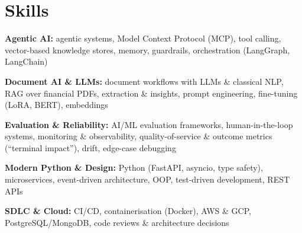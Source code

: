 \documentclass[10pt,a4paper]{article}
\begin{document}
\section{Skills}
\begin{tight}
  \item[\textcolor{accent}{\small$\bullet$}] \textbf{Agentic AI:} agentic systems, Model Context Protocol (MCP), tool calling, vector-based knowledge stores, memory, guardrails, orchestration (LangGraph, LangChain)
  \item[\textcolor{accent}{\small$\bullet$}] \textbf{Document AI \& LLMs:} document workflows with LLMs \& classical NLP, RAG over financial PDFs, extraction \& insights, prompt engineering, fine-tuning (LoRA, BERT), embeddings
  \item[\textcolor{accent}{\small$\bullet$}] \textbf{Evaluation \& Reliability:} AI/ML evaluation frameworks, human-in-the-loop systems, monitoring \& observability, quality-of-service \& outcome metrics (``terminal impact''), drift, edge-case debugging
  \item[\textcolor{accent}{\small$\bullet$}] \textbf{Modern Python \& Design:} Python (FastAPI, asyncio, type safety), microservices, event-driven architecture, OOP, test-driven development, REST APIs
  \item[\textcolor{accent}{\small$\bullet$}] \textbf{SDLC \& Cloud:} CI/CD, containerisation (Docker), AWS \& GCP, PostgreSQL/MongoDB, code reviews \& architecture decisions
\end{tight}

\end{document}

